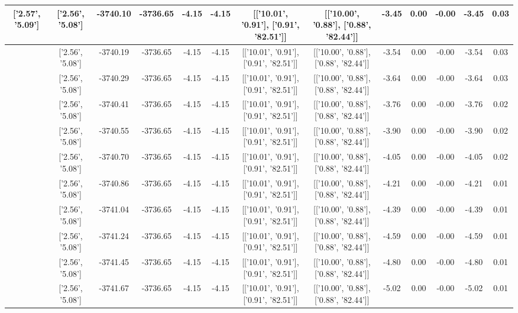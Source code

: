 \begin{table}[htbp]
\begin{adjustbox}{angle=90}
\begin{tabular}{|c|c|c|c|c|c|c|c|c|c|c|c|c|}
 ['2.57', '5.09'] & ['2.56', '5.08'] & -3740.10 & -3736.65 & -4.15 & -4.15 & [['10.01', '0.91'], ['0.91', '82.51']] & [['10.00', '0.88'], ['0.88', '82.44']] & -3.45 & 0.00 & -0.00 & -3.45 & 0.03\\ \hline
 ['2.57', '5.09'] & ['2.56', '5.08'] & -3740.19 & -3736.65 & -4.15 & -4.15 & [['10.01', '0.91'], ['0.91', '82.51']] & [['10.00', '0.88'], ['0.88', '82.44']] & -3.54 & 0.00 & -0.00 & -3.54 & 0.03\\ \hline
 ['2.57', '5.09'] & ['2.56', '5.08'] & -3740.29 & -3736.65 & -4.15 & -4.15 & [['10.01', '0.91'], ['0.91', '82.51']] & [['10.00', '0.88'], ['0.88', '82.44']] & -3.64 & 0.00 & -0.00 & -3.64 & 0.03\\ \hline
 ['2.57', '5.09'] & ['2.56', '5.08'] & -3740.41 & -3736.65 & -4.15 & -4.15 & [['10.01', '0.91'], ['0.91', '82.51']] & [['10.00', '0.88'], ['0.88', '82.44']] & -3.76 & 0.00 & -0.00 & -3.76 & 0.02\\ \hline
 ['2.57', '5.09'] & ['2.56', '5.08'] & -3740.55 & -3736.65 & -4.15 & -4.15 & [['10.01', '0.91'], ['0.91', '82.51']] & [['10.00', '0.88'], ['0.88', '82.44']] & -3.90 & 0.00 & -0.00 & -3.90 & 0.02\\ \hline
 ['2.58', '5.09'] & ['2.56', '5.08'] & -3740.70 & -3736.65 & -4.15 & -4.15 & [['10.01', '0.91'], ['0.91', '82.51']] & [['10.00', '0.88'], ['0.88', '82.44']] & -4.05 & 0.00 & -0.00 & -4.05 & 0.02\\ \hline
 ['2.58', '5.09'] & ['2.56', '5.08'] & -3740.86 & -3736.65 & -4.15 & -4.15 & [['10.01', '0.91'], ['0.91', '82.51']] & [['10.00', '0.88'], ['0.88', '82.44']] & -4.21 & 0.00 & -0.00 & -4.21 & 0.01\\ \hline
 ['2.58', '5.09'] & ['2.56', '5.08'] & -3741.04 & -3736.65 & -4.15 & -4.15 & [['10.01', '0.91'], ['0.91', '82.51']] & [['10.00', '0.88'], ['0.88', '82.44']] & -4.39 & 0.00 & -0.00 & -4.39 & 0.01\\ \hline
 ['2.58', '5.09'] & ['2.56', '5.08'] & -3741.24 & -3736.65 & -4.15 & -4.15 & [['10.01', '0.91'], ['0.91', '82.51']] & [['10.00', '0.88'], ['0.88', '82.44']] & -4.59 & 0.00 & -0.00 & -4.59 & 0.01\\ \hline
 ['2.58', '5.09'] & ['2.56', '5.08'] & -3741.45 & -3736.65 & -4.15 & -4.15 & [['10.01', '0.91'], ['0.91', '82.51']] & [['10.00', '0.88'], ['0.88', '82.44']] & -4.80 & 0.00 & -0.00 & -4.80 & 0.01\\ \hline
 ['2.58', '5.09'] & ['2.56', '5.08'] & -3741.67 & -3736.65 & -4.15 & -4.15 & [['10.01', '0.91'], ['0.91', '82.51']] & [['10.00', '0.88'], ['0.88', '82.44']] & -5.02 & 0.00 & -0.00 & -5.02 & 0.01\\ \hline

\end{tabular}
\end{adjustbox}
\end{table}

